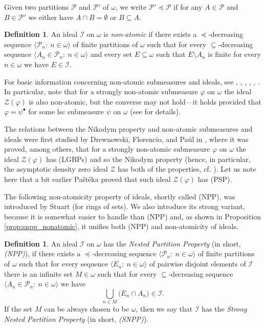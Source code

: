 \documentclass[a4paper,11pt,fleqn]{amsart}
\theoremstyle{definition}
\newtheorem{definition}[theorem]{Definition}
\theoremstyle{remark}
\numberwithin{equation}{section}
\newcommand{\N}{\mathbb{N}}
\newcommand{\iI}{\mathcal{I}}
\newcommand{\pP}{\mathcal{P}}
\newcommand{\zZ}{\mathcal{Z}}
\newcommand{\sm}{\setminus}
\newcommand{\sub}{\subseteq}
\newcommand{\seqn}[1]{\big\langle#1\colon\ n\io\big\rangle}
\newcommand{\io}{\in\omega}%
\begin{document}
Given two partitions $\pP$ and $\pP'$ of $\omega$, we write $\pP'\preceq\pP$ if for any $A\in\pP$ and $B\in\pP'$ we either have $A\cap B=\emptyset$ or $B\sub A$.

\begin{definition}\label{def:nonat_ideal}
    An ideal $\iI$ on $\omega$ is \textit{non-atomic} if there exists a $\preceq$-decreasing sequence $\seqn{\pP_n}$ of finite partitions of $\omega$ such that for every $\subseteq$-decreasing sequence $\seqn{A_n\in\pP_n}$ and every set $E\sub\omega$ such that $E\sm A_n$ is finite for every $n\io$ we have $E\in\iI$.
\end{definition}

For basic information concerning non-atomic submeasures and ideals, see \cite{BFMS11}, \cite{DL08}, \cite{DL08ii}, \cite{DL09}, \cite{FMRS07}, \cite{FS10s}. In particular, note that for a strongly non-atomic submeasure $\varphi$ on $\omega$ the ideal $\zZ(\varphi)$ is also non-atomic, but the converse may not hold---it holds provided that $\varphi=\psi^\bullet$ for some lsc submeasure $\psi$ on $\omega$ (see \cite[Section 3]{DL08ii} for details).

The relations between the Nikodym property and non-atomic submeasures and ideals were first studied by Drewnowski, Florencio, and Pa\'ul in \cite{DFP96}, where it was proved, among others, that for a strongly non-atomic submeasure $\varphi$ on $\omega$ the ideal $\zZ(\varphi)$ has (LGBPs) and so the Nikodym property (hence, in particular, the asymptotic density zero ideal $\zZ$ has both of the properties, cf. \cite[Proposition 6]{DFP94}). Let us note here that a bit earlier Pa\v{s}t\'{e}ka \cite{Pas90} proved that such ideal $\zZ(\varphi)$ has (PSP).

The following non-atomicity property of ideals, shortly called (NPP), was introduced by Stuart \cite{Stu07} (for rings of sets). We also introduce its strong variant, because it is somewhat easier to handle than (NPP) and, as shown in Proposition \ref{prop:snpp_nonatomic}, it unifies both (NPP) and non-atomicity of ideals. 

\begin{definition}\label{def:npp}
    An ideal $\iI$ on $\omega$ has the \textit{Nested Partition Property} (in short, \textit{(NPP)}), if there exists a $\preceq$-decreasing sequence $\seqn{\pP_n}$ of finite partitions of $\omega$ such that for every sequence $\seqn{E_n}$ of pairwise disjoint elements of $\iI$ there is an infinite set $M\io$ such that for every $\subseteq$-decreasing sequence $\seqn{A_n\in\pP_n}$ we have
    \[\bigcup_{n\in M}\big(E_n\cap A_n\big)\in\iI.\]
    If the set $M$ can be always chosen to be $\omega$, then we say that $\iI$ has the \textit{Strong Nested Partition Property} (in short, \textit{(SNPP)}).
\end{definition}
\end{document}
